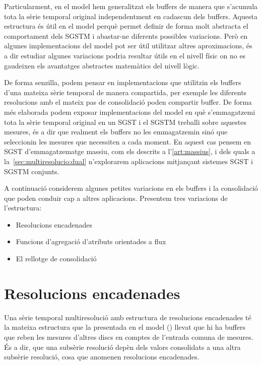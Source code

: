 Particularment, en el model hem generalitzat els buffers de manera que
s'acumula tota la sèrie temporal original independentment en cadascun
dels buffers. Aquesta estructura és útil en el model perquè permet
definir de forma molt abstracta el comportament dels \gls{SGSTM} i
abastar-ne diferents possibles variacions.  Però en algunes
implementacions del model pot ser útil utilitzar altres aproximacions,
és a dir estudiar algunes variacions podria resultar útils en el nivell físic
on no es gaudeixen els avantatges abstractes matemàtics del nivell
lògic.




De forma senzilla, podem pensar en implementacions que utilitzin els
buffers d'una mateixa sèrie temporal de manera compartida, per exemple
les diferents resolucions amb el mateix pas de consolidació poden
compartir buffer. De forma més elaborada podem exposar implementacions
del model en què s'emmagatzemi tota la sèrie temporal original en un
\gls{SGST} i el \gls{SGSTM} treballi sobre aquestes mesures, és a dir
que realment els buffers no les emmagatzemin sinó que seleccionin les
mesures que necessiten a cada moment. En aquest cas pensem en
\gls{SGST} d'emmagatzematge massiu, com els descrits a
l'\autoref{art:massius}, i dels quals a
la~\autoref{sec:multiresolucio:dual} n'explorarem aplicacions
mitjançant sistemes \gls{SGST} i \gls{SGSTM} conjunts.


A continuació considerem algunes petites variacions en els buffers i
la consolidació que poden conduir cap a altres aplicacions.  Presentem
tres variacions de l'estructura:
\begin{itemize}
\item Resolucions encadenades

\item Funcions d'agregació d'atributs orientades a flux

\item El rellotge de consolidació
\end{itemize}









\section{Resolucions encadenades}


Una sèrie temporal multiresolució amb estructura de resolucions
encadenades té la mateixa estructura que la presentada en el model
() llevat que hi ha buffers que
reben les mesures d'altres discs en comptes de l'entrada comuna de
mesures.  És a dir, que una subsèrie resolució depèn dels valors
consolidats a una altra subsèrie resolució, cosa que anomenen
resolucions encadenades.



